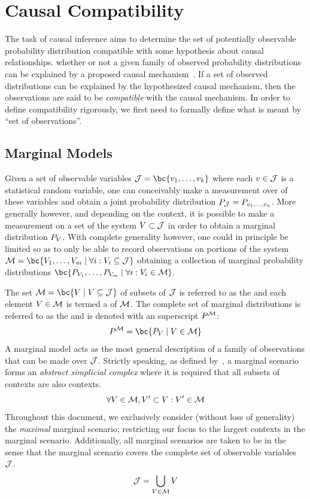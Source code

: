 \documentclass[aps, 10pt, english, twoside, pra, nofootinbib, tightenlines, longbibliography]{revtex4-1}
\begin{document}
    \section{Causal Compatibility}
    \label{sec:causal_compatibility}
    The task of causal inference aims to determine the set of potentially observable probability distribution compatible with some hypothesis about causal relationships. whether or not a given family of observed probability distributions can be explained by a proposed causal mechanism~\cite{Pearl_2009}. If a set of observed distributions can be explained by the hypothesized causal mechanism, then the observations are said to be \textit{compatible} with the causal mechanism. In order to define compatibility rigorously, we first need to formally define what is meant by ``set of observations''.

    \subsection{Marginal Models}
    Given a set of observable variables $\jointvar = \bc{v_1, \ldots, v_k}$ where each $v \in \mathcal{J}$ is a statistical random variable, one can conceivably make a measurement over of these variables and obtain a joint probability distribution $\prob[\jointvar] = \prob[v_1,\ldots,v_n]$. More generally however, and depending on the context, it is possible to make a measurement on a set of the system $V \subset \mathcal{J}$ in order to obtain a marginal distribution $\prob[V]$. With complete generality however, one could in principle be limited so as to only be able to record observations on portions of the system $\mscenario = \bc{V_1, \ldots, V_m \mid \forall i : V_i \subseteq \jointvar}$ obtaining a collection of marginal probability distributions $\bc{\prob[V_1], \ldots, \prob[V_m] \mid \forall i: V_i \in \mscenario}$.

    The set $\mscenario = \bc{V \mid V \subseteq \jointvar}$ of subsets of $\mathcal{J}$ is referred to as the  and each element $V \in \mathcal{M}$ is termed a  of $\mathcal{M}$. The complete set of marginal distributions is referred to as the  and is denoted with an superscript $\prob^{\mscenario}$:
    \[ \prob^{\mscenario} = \bc{\prob[V] \mid V \in \mscenario} \]
    A marginal model acts as the most general description of a family of observations that can be made over $\mathcal{J}$. Strictly speaking, as defined by~\cite{Fritz_2011}, a marginal scenario forms an \textit{abstract simplicial complex} where it is required that all subsets of contexts are also contexts.
    \[ \forall V \in \mathcal{M}, V' \subset V : V' \in \mathcal{M} \]
    Throughout this document, we exclusively consider (without loss of generality) the \textit{maximal} marginal scenario; restricting our focus to the largest contexts in the marginal scenario. Additionally, all marginal scenarios are taken to be  in the sense that the marginal scenario covers the complete set of observable variables $\mathcal{J}$.
    \[ \mathcal{J} = \bigcup_{V \in \mathcal{M}} V \]
\end{document}

